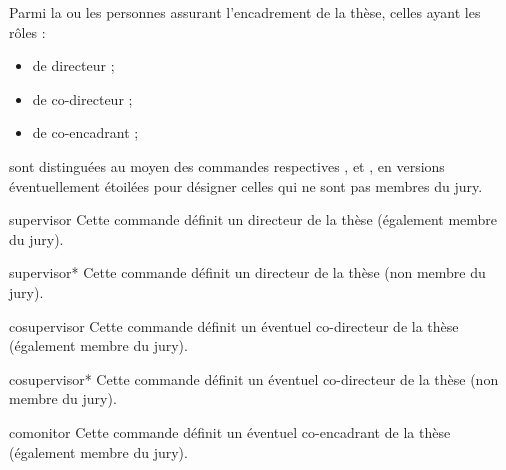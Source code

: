 Parmi la ou les personnes assurant l'encadrement de la thèse,
celles ayant les rôles :
\begin{itemize}
\item de directeur  ;
\item de co-directeur ;
\item de co-encadrant ;
\end{itemize}
sont distinguées au moyen des commandes respectives ,
 et , en versions éventuellement étoilées
pour désigner celles qui ne sont pas membres du jury.%
%
%
%
\begin{docCommand}[doc
  description=\mandatory]{supervisor}{}
  Cette commande définit un directeur de la thèse (également membre du jury).
\end{docCommand}

\begin{docCommand}[doc description=\mandatory]{supervisor*}{}
  Cette commande définit un directeur de la thèse (non membre du jury).
\end{docCommand}

\begin{docCommand}{cosupervisor}{}
  Cette commande définit un éventuel co-directeur de la thèse (également membre du jury).
\end{docCommand}

\begin{docCommand}{cosupervisor*}{}
  Cette commande définit un éventuel co-directeur de la thèse (non membre du jury).
\end{docCommand}

\begin{docCommand}{comonitor}{}
  Cette commande définit un éventuel co-encadrant de la thèse (également membre du jury).
\end{docCommand}

